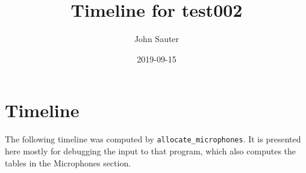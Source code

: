 \documentclass[letterpaper]{article}
\title{Timeline for test002}
\author{John Sauter}
\date{2019-09-15}
\begin{document}
\maketitle
\newpage

\section {Timeline}
The following timeline was computed by {\tt allocate\_microphones}.
It is presented here mostly for debugging the input to that program,
which also computes the tables in the Microphones section.


\end{document}
